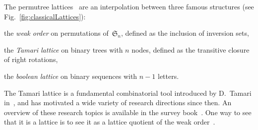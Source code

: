 \documentclass[a4paper,12pt]{article}
\newcommand{\fS}{\mathfrak{S}} %
\newcommand{\defn}[1]{\emph{\color{blue} #1}} %
\begin{document}
The permutree lattices~\cite{PilaudPons-permutrees} are an interpolation between three famous structures (see Fig.~\ref{fig:classicalLattices}):

\begin{compactitem}
\item the \defn{weak order} on permutations of~$\fS_n$, defined as the inclusion of inversion sets,
\item the \defn{Tamari lattice} on binary trees with $n$ nodes, defined as the transitive closure of right rotations,
\item the \defn{boolean lattice} on binary sequences with $n-1$ letters.
\end{compactitem}
The Tamari lattice is a fundamental combinatorial tool introduced by D.~Tamari in~\cite{Tamari}, and has motivated a wide variety of research directions since then.
An overview of these research topics is available in the survey book~\cite{TamariFestschrift}.
One way to see that it is a lattice is to see it as a lattice quotient of the weak order~\cite{Reading-cambrianLattices, ChatelPilaud}.
\end{document}
